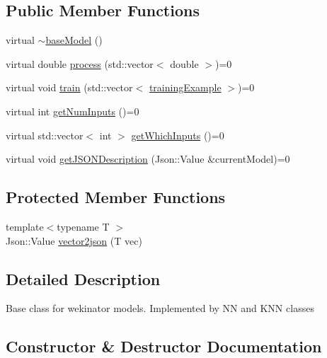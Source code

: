 \subsection*{Public Member Functions}
\begin{DoxyCompactItemize}
\item 
virtual \hyperlink{classbase_model_a7c96328a8eda015d7f1b3d195e2fd567}{$\sim$base\+Model} ()
\item 
virtual double \hyperlink{classbase_model_a07d92b944728ff2b3339d6bceaecb6a3}{process} (std\+::vector$<$ double $>$)=0
\item 
virtual void \hyperlink{classbase_model_aed9192d6c0f17a1816a55b077baf2523}{train} (std\+::vector$<$ \hyperlink{structtraining_example}{training\+Example} $>$)=0
\item 
virtual int \hyperlink{classbase_model_a1601088280ebe5be525fd1fe49d4b1e1}{get\+Num\+Inputs} ()=0
\item 
virtual std\+::vector$<$ int $>$ \hyperlink{classbase_model_a5d6b7579536f5713eed0b7b4a6687a16}{get\+Which\+Inputs} ()=0
\item 
virtual void \hyperlink{classbase_model_a54c7ba2132721c2f990ea2fe2313f863}{get\+J\+S\+O\+N\+Description} (Json\+::\+Value \&current\+Model)=0
\end{DoxyCompactItemize}
\subsection*{Protected Member Functions}
\begin{DoxyCompactItemize}
\item 
{\footnotesize template$<$typename T $>$ }\\Json\+::\+Value \hyperlink{classbase_model_a853d3a2d610c43fca37676ac1459e3b9}{vector2json} (T vec)
\end{DoxyCompactItemize}


\subsection{Detailed Description}
Base class for wekinator models. Implemented by NN and K\+NN classes 

\subsection{Constructor \& Destructor Documentation}
\mbox{\label{classbase_model_a7c96328a8eda015d7f1b3d195e2fd567}} 
